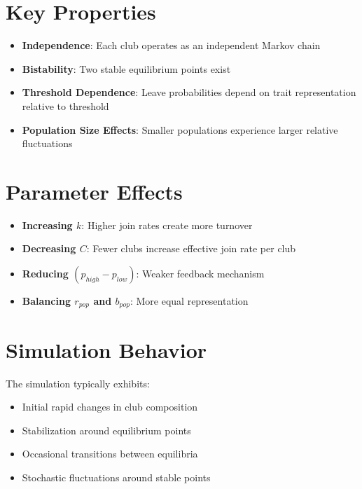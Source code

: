 \documentclass{article}
\begin{document}
\section{Key Properties}
\begin{itemize}
    \item \textbf{Independence}: Each club operates as an independent Markov chain
    \item \textbf{Bistability}: Two stable equilibrium points exist
    \item \textbf{Threshold Dependence}: Leave probabilities depend on trait representation relative to threshold
    \item \textbf{Population Size Effects}: Smaller populations experience larger relative fluctuations
\end{itemize}

\section{Parameter Effects}
\begin{itemize}
    \item \textbf{Increasing $k$}: Higher join rates create more turnover
    \item \textbf{Decreasing $C$}: Fewer clubs increase effective join rate per club
    \item \textbf{Reducing $(p_{high} - p_{low})$}: Weaker feedback mechanism
    \item \textbf{Balancing $r_{pop}$ and $b_{pop}$}: More equal representation
\end{itemize}

\section{Simulation Behavior}
The simulation typically exhibits:
\begin{itemize}
    \item Initial rapid changes in club composition
    \item Stabilization around equilibrium points
    \item Occasional transitions between equilibria
    \item Stochastic fluctuations around stable points
\end{itemize}
\end{document}
